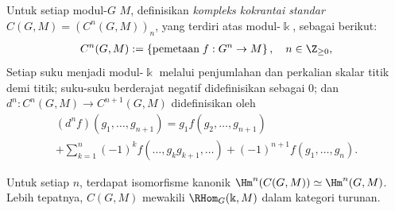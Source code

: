 \begin{proposisi}\label{prop:groupcoh-cochain}
	Untuk setiap modul-$G$ $M$, definisikan \emph{kompleks kokrantai standar}
	$C(G,M)=(C^n(G,M))_n$, yang terdiri atas modul-$\Bbbk$, sebagai berikut:
	\begin{gather*}
		C^n(G, M) := \left\{ \text{pemetaan}\; f: G^n \to M \right\}, \quad n \in \Z_{\geq 0},
	\end{gather*}
	Setiap suku menjadi modul-$\Bbbk$ melalui penjumlahan dan perkalian skalar
	titik demi titik; suku-suku berderajat negatif didefinisikan sebagai $0$;
	dan $d^n:C^n(G,M)\to C^{n+1}(G,M)$ didefinisikan oleh
	\begin{multline*}
		(d^n f)(g_1, \ldots, g_{n+1}) = g_1 f(g_2, \ldots, g_{n+1}) \\
		+ \sum_{k=1}^n (-1)^k f(\ldots, g_k g_{k+1}, \ldots) + (-1)^{n+1} f(g_1, \ldots, g_n).
	\end{multline*}

	Untuk setiap $n$, terdapat isomorfisme kanonik
	$\Hm^n(C(G,M))\simeq\Hm^n(G,M)$. Lebih tepatnya, $C(G,M)$ mewakili
	$\RHom_G(\Bbbk,M)$ dalam kategori turunan.
\end{proposisi}
